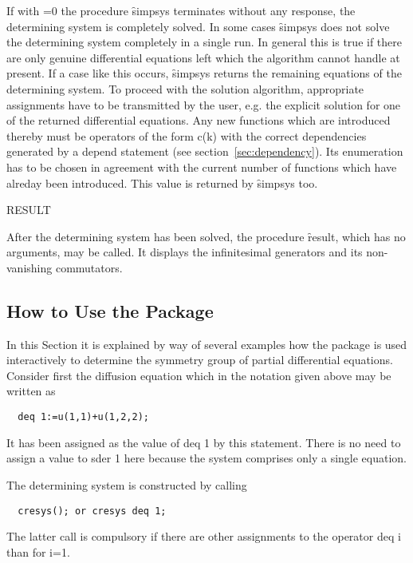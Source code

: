 If with =0 the procedure \f{simpsys} terminates without any
response, the determining system is completely solved.  In some cases
\f{simpsys} does not solve the determining system completely in a single
run. In general this is true if there are only genuine differential
equations left which the algorithm cannot handle at present. If a case
like this occurs, \f{simpsys} returns the remaining equations of the
determining system. To proceed with the solution algorithm,
appropriate assignments have to be transmitted by the user, e.g. the
explicit solution for one of the returned differential equations. Any
new functions which are introduced thereby must be operators of the
form c(k) with the correct dependencies generated by a depend
statement (see section~\ref{sec:dependency}). Its enumeration has to be
chosen in agreement with the current number of functions which have
alreday been introduced.  This value is returned by \f{simpsys} too.

\hypertarget{operator}{RESULT}{}
After the determining system has been solved, the procedure \f{result},
which has no arguments, may be called. It displays the infinitesimal
generators and its non-vanishing commutators.


\subsection{How to Use the Package}

In this Section it is explained by way of several examples how the
package  is used interactively to determine the symmetry group of
partial differential equations. Consider first the diffusion equation
which in the notation given above may be written as

\begin{verbatim}
  deq 1:=u(1,1)+u(1,2,2);
\end{verbatim}

It has been assigned as the value of deq 1 by this statement.  There
is no need to assign a value to sder 1 here because the system
comprises only a single equation.

The determining system is constructed by calling

\begin{verbatim}
  cresys(); or cresys deq 1;
\end{verbatim}

The latter call is compulsory if there are other assignments to the
operator deq i than for i=1.

